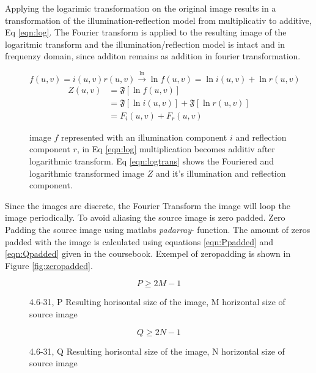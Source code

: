Applying the logarimic transformation on the original image results in a transformation of the illumination-reflection model from multiplicativ to additive, Eq \ref{eqn:log}. The Fourier transform is applied to the resulting image of the logaritmic transform and the illumination/reflection model is intact and in frequenzy domain, since additon remains as addition in fourier transformation.
\begin{figure}[h!]
\begin{equation}
  f(u,v) = i(u,v) r(u,v) \xrightarrow{\ln} \ln{f(u,v)} = \ln{i(u,v)} + \ln{r(u,v)} 
  \label{eqn:log}
\end{equation}
  \begin{equation}
    \begin{split}
      Z(u,v) &= \mathfrak{F} [\ln{f(u,v)}]\\ &= \mathfrak{F}[\ln{i(u,v)}] + \mathfrak{F}[\ln{r(u,v)}]\\ &= F_i(u,v) + F_r(u,v)
    \end{split}
    \label{eqn:logtrans}
  \end{equation}
\caption{image $f$ represented with an illumination component $i$ and reflection component $r$, in Eq \ref{eqn:log} multiplication becomes additiv after logarithmic transform. Eq \ref{eqn:logtrans} shows the Fouriered and logarithmic transformed image $Z$ and it's illumination and reflection component. }
\end{figure}

Since the images are discrete, the Fourier Transform the image will loop the image periodically. To avoid aliasing the source image is zero padded. Zero Padding the source image using matlabs \textit{padarray}- function. The amount of zeros padded with the image is calculated using equations \ref{eqn:Ppadded} and \ref{eqn:Qpadded} given in the coursebook\cite[p. 274]{dipBook}. Exempel of zeropadding is shown in Figure \ref{fig:zeropadded}.
\begin{figure}[h!]
\begin{equation}
  P \geq 2M -1
  \label{eqn:Ppadded}
\end{equation}
\caption{4.6-31, P Resulting horisontal size of the image, M horizontal size of source image}
\end{figure}

\begin{figure}[h!]
  \begin{equation}
    Q \geq 2N -1
    \label{eqn:Qpadded}
  \end{equation}
  \caption{4.6-31, Q Resulting horisontal size of the image, N horizontal size of source image}
\end{figure}

